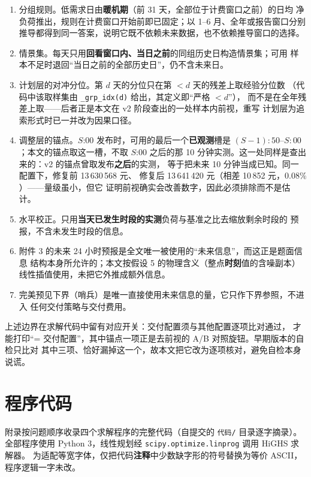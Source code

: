 \documentclass[withoutpreface]{cumcmthesis}
\renewcommand{\emph}[1]{\textbf{#1}}
\begin{document}
\begin{appendices}
\begin{enumerate}[itemsep=1pt, topsep=2pt]
  \item 分组规则。低需求日由\emph{暖机期}（前 31 天，全部位于计费窗口之前）的日均
        净负荷推出，规则在计费窗口开始前即已固定；以 1--6 月、全年或报告窗口分别
        推导都得到同一答案，说明它既不依赖未来数据，也不依赖推导窗口的选择。
  \item 情景集。每天只用\emph{回看窗口内、当日之前}的同组历史日构造情景集；可用
        样本不足时退回“当日之前的全部历史日”，仍不含未来日。
  \item 计划层的对冲分位。第 $d$ 天的分位只在第 $<d$ 天的残差上取经验分位数
        （代码中该取样集由 \texttt{\_grp\_idx(d)} 给出，其定义即“严格 $<d$”），
        而不是在全年残差上取——后者正是本文在 v2 阶段查出的一处样本内前视，重写
        计划层为追索形式时已一并改为因果口径。
  \item 调整层的锚点。$S$:00 发布时，可用的最后一个\emph{已观测}槽是
        $(S{-}1){:}50$--$S{:}00$；本文的锚点取这一槽，不取 $S$:00 之后的那
        10 分钟实测。这一处同样是查出来的：v2 的锚点曾取发布\emph{之后}的实测，
        等于把未来 10 分钟当成已知。同一配置下，修复前 13\,630\,568 元、
        修复后 13\,641\,420 元（相差 10\,852 元，$0.08\%$）——量级虽小，但它
        证明前视确实会改善数字，因此必须排除而不是估计。
  \item 水平校正。只用\emph{当天已发生时段的实测}负荷与基准之比去缩放剩余时段的
        预报，不含未发生时段的信息。
  \item 附件 3 的未来 24 小时预报是全文唯一被使用的“未来信息”，而这正是题面信息
        结构本身所允许的；本文按假设 5 的物理含义（整点\emph{时刻}值的含噪副本）
        线性插值使用，未把它外推成额外信息。
  \item 完美预见下界（哨兵）是唯一直接使用未来信息的量，它只作下界参照，不进入
        任何交付策略与交付费用。
\end{enumerate}

\noindent 上述边界在求解代码中留有对应开关：交付配置须与其他配置逐项比对通过，
才能打印“= 交付配置”，其中锚点一项正是去前视的 A/B 对照旋钮。早期版本的自检只比对
其中三项、恰好漏掉这一个，故本文把它改为逐项核对，避免自检本身说谎。

\section{程序代码}

附录按问题顺序收录四个求解程序的完整代码（自提交的 \texttt{代码/} 目录逐字摘录）。
全部程序使用 Python 3，线性规划经 \texttt{scipy.optimize.linprog} 调用 HiGHS 求解器。
为适配等宽字体，仅把代码\emph{注释}中少数缺字形的符号替换为等价 ASCII，
程序逻辑一字未改。


\end{appendices}
\end{document}
